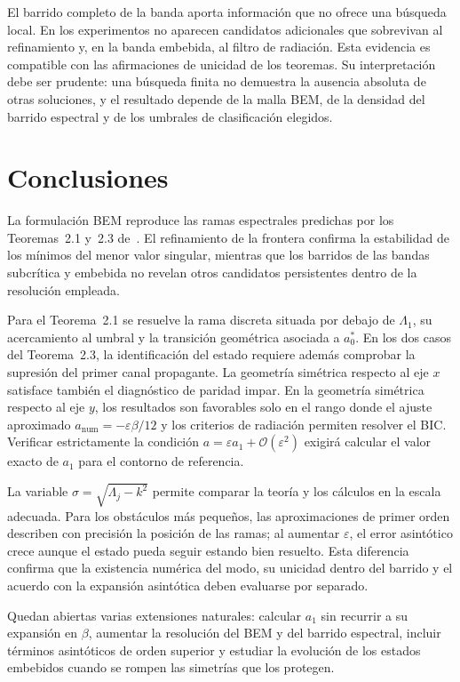 \documentclass[11pt]{article}
\begin{document}
El barrido completo de la banda aporta información que no ofrece una búsqueda local. En los experimentos no aparecen candidatos adicionales que sobrevivan al refinamiento y, en la banda embebida, al filtro de radiación. Esta evidencia es compatible con las afirmaciones de unicidad de los teoremas. Su interpretación debe ser prudente: una búsqueda finita no demuestra la ausencia absoluta de otras soluciones, y el resultado depende de la malla BEM, de la densidad del barrido espectral y de los umbrales de clasificación elegidos.

\section{Conclusiones}

La formulación BEM reproduce las ramas espectrales predichas por los Teoremas~2.1 y~2.3 de~\cite{Zhevandrov2025}. El refinamiento de la frontera confirma la estabilidad de los mínimos del menor valor singular, mientras que los barridos de las bandas subcrítica y embebida no revelan otros candidatos persistentes dentro de la resolución empleada.

Para el Teorema~2.1 se resuelve la rama discreta situada por debajo de \(\Lambda_1\), su acercamiento al umbral y la transición geométrica asociada a \(a_0^*\). En los dos casos del Teorema~2.3, la identificación del estado requiere además comprobar la supresión del primer canal propagante. La geometría simétrica respecto al eje \(x\) satisface también el diagnóstico de paridad impar. En la geometría simétrica respecto al eje \(y\), los resultados son favorables solo en el rango donde el ajuste aproximado \(a_{\mathrm{num}}=-\varepsilon\beta/12\) y los criterios de radiación permiten resolver el BIC. Verificar estrictamente la condición \(a=\varepsilon a_1+\mathcal{O}(\varepsilon^2)\) exigirá calcular el valor exacto de \(a_1\) para el contorno de referencia.

La variable \(\sigma=\sqrt{\Lambda_j-k^2}\) permite comparar la teoría y los cálculos en la escala adecuada. Para los obstáculos más pequeños, las aproximaciones de primer orden describen con precisión la posición de las ramas; al aumentar \(\varepsilon\), el error asintótico crece aunque el estado pueda seguir estando bien resuelto. Esta diferencia confirma que la existencia numérica del modo, su unicidad dentro del barrido y el acuerdo con la expansión asintótica deben evaluarse por separado.

Quedan abiertas varias extensiones naturales: calcular \(a_1\) sin recurrir a su expansión en \(\beta\), aumentar la resolución del BEM y del barrido espectral, incluir términos asintóticos de orden superior y estudiar la evolución de los estados embebidos cuando se rompen las simetrías que los protegen.



\end{document}
